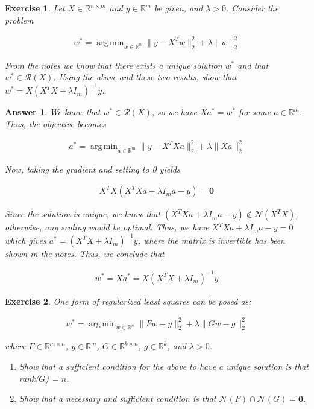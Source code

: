\documentclass[12pt]{article}
\DeclareMathOperator*{\argmin}{arg\,min}
\theoremstyle{colon}
\newtheorem{exercise}{Exercise}
\newtheorem*{answer}{Answer}
\begin{document}
\clearpage

\begin{exercise}
  Let $X \in \mathbb{R}^{n \times m}$ and $y \in \mathbb{R}^{m}$ be given, and $\lambda > 0$. Consider the problem

  \begin{gather*}
    w^* = \argmin_{w \in \mathbb{R}^n} \lVert y - X^T w \rVert_2^2 + \lambda \lVert w \rVert_2^2
  \end{gather*}

  From the notes we know that there exists a unique solution $w^*$ and that $w^* \in \mathcal{R}(X)$. Using the above and these two results, show that $w^* = X (X^TX + \lambda I_m)^{-1} y$.
\end{exercise}

\begin{answer}
  We know that $w^* \in \mathcal{R}(X)$, so we have $X a^* = w^*$ for some $a \in \mathbb{R}^m$. Thus, the objective becomes

  \begin{gather*}
    a^* = \argmin_{a \in \mathbb{R}^m} \lVert y - X^T X a \rVert_2^2 + \lambda \lVert X a \rVert_2^2
  \end{gather*}

  Now, taking the gradient and setting to 0 yields

  \begin{gather*}
    X^T X (X^T X a + \lambda I_m a - y) = \bm{0}
  \end{gather*}

  Since the solution is unique, we know that $(X^T X a + \lambda I_m a - y) \notin \mathcal{N}(X^T X)$, otherwise, any scaling would be optimal. Thus, we have $X^T X a + \lambda I_m a - y = 0$ which gives $a^* = (X^T X + \lambda I_m)^{-1} y$, where the matrix is invertible has been shown in the notes. Thus, we conclude that

  \begin{gather*}
    w^* = X a^* = X (X^T X + \lambda I_m)^{-1} y
  \end{gather*}
\end{answer}

\clearpage

\begin{exercise}
  One form of regularized least squares can be posed as:

  \begin{gather*}
    w^* = \argmin_{w \in \mathbb{R}^n} \lVert F w - y \rVert_2^2 + \lambda \lVert G w - g \rVert_2^2
  \end{gather*}

  where $F \in \mathbb{R}^{m \times n}$, $y \in \mathbb{R}^m$, $G \in \mathbb{R}^{k \times n}$, $g \in \mathbb{R}^k$, and $\lambda > 0$.

  \begin{enumerate}[label=\alph*)]
    \item Show that a sufficient condition for the above to have a unique solution is that rank($G$) = $n$.
    \item Show that a necessary and sufficient condition is that $\mathcal{N}(F) \cap \mathcal{N}(G) = \mathbf{0}$.
  \end{enumerate}
\end{exercise}
\end{document}
